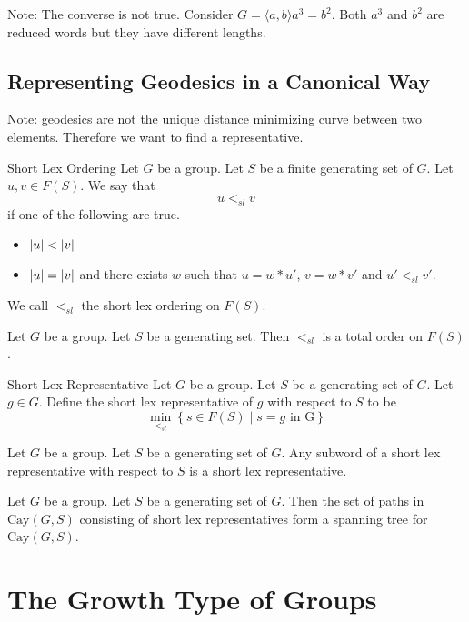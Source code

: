 \documentclass[a4paper]{article}
\begin{document}
Note: The converse is not true. Consider $G=\langle a,b\rangle a^3=b^2$. Both $a^3$ and $b^2$ are reduced words but they have different lengths. \\

\subsection{Representing Geodesics in a Canonical Way}
Note: geodesics are not the unique distance minimizing curve between two elements. Therefore we want to find a representative. 

\begin{defn}{Short Lex Ordering}{} Let $G$ be a group. Let $S$ be a finite generating set of $G$. Let $u,v\in F(S)$. We say that $$u<_{sl}v$$ if one of the following are true. 
\begin{itemize}
\item $\abs{u}<\abs{v}$
\item $\abs{u}=\abs{v}$ and there exists $w$ such that $u=w\ast u'$, $v=w\ast v'$ and $u'<_{sl}v'$. 
\end{itemize}
We call $<_{sl}$ the short lex ordering on $F(S)$. 
\end{defn}

\begin{lmm}{}{} Let $G$ be a group. Let $S$ be a generating set. Then $<_{sl}$ is a total order on $F(S)$. 
\end{lmm}

\begin{defn}{Short Lex Representative}{} Let $G$ be a group. Let $S$ be a generating set of $G$. Let $g\in G$. Define the short lex representative of $g$ with respect to $S$ to be $$\min_{<_{sl}}\left\{s\in F(S)\;|\;s=g\text{ in G}\right\}$$
\end{defn}

\begin{lmm}{}{} Let $G$ be a group. Let $S$ be a generating set of $G$. Any subword of a short lex representative with respect to $S$ is a short lex representative. 
\end{lmm}

\begin{crl}{}{} Let $G$ be a group. Let $S$ be a generating set of $G$. Then the set of paths in $\text{Cay}(G,S)$ consisting of short lex representatives form a spanning tree for $\text{Cay}(G,S)$. 
\end{crl}

\pagebreak
\section{The Growth Type of Groups}
\end{document}

